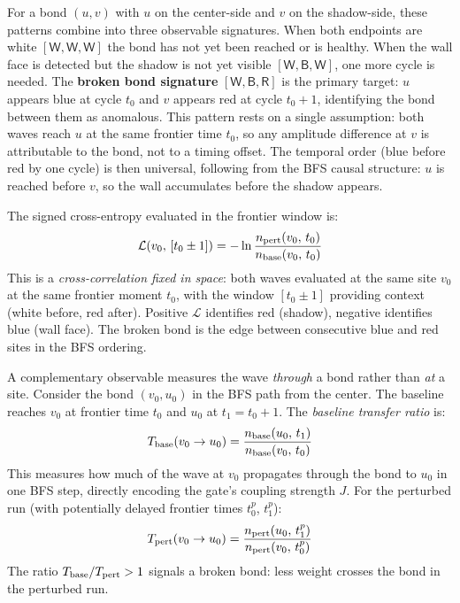 \documentclass[11pt]{article}
\begin{document}
For a bond $(u, v)$ with $u$ on the center-side and $v$ on the shadow-side,
these patterns combine into three observable signatures. When both endpoints
are white $[\mathsf{W,W,W}]$ the bond has not yet been reached or is healthy.
When the wall face is detected but the shadow is not yet visible $[\mathsf{W,B,W}]$,
one more cycle is needed. The \textbf{broken bond signature} $[\mathsf{W,B,R}]$
is the primary target: $u$ appears blue at cycle $t_0$ and $v$ appears red at
cycle $t_0+1$, identifying the bond between them as anomalous.
This pattern rests on a single assumption: both waves reach $u$ at the same
frontier time $t_0$, so any amplitude difference at $v$ is attributable to the
bond, not to a timing offset. The temporal order (blue before red by one cycle)
is then universal, following from the BFS causal structure: $u$ is reached
before $v$, so the wall accumulates before the shadow appears.

The signed cross-entropy evaluated in the frontier window is:
\begin{equation}
    \mathcal{L}(v_0,\, [t_0 \pm 1]) = -\ln \frac{n_{\rm pert}(v_0,\, t_0)}
                                                  {n_{\rm base}(v_0,\, t_0)}
\end{equation}
This is a \emph{cross-correlation fixed in space}: both waves evaluated at the same
site $v_0$ at the same frontier moment $t_0$, with the window $[t_0 \pm 1]$
providing context (white before, red after).
Positive $\mathcal{L}$ identifies red (shadow), negative identifies blue (wall face).
The broken bond is the edge between consecutive blue and red sites in the BFS ordering.

A complementary observable measures the wave \emph{through} a bond rather than \emph{at} a site.
Consider the bond $(v_0, u_0)$ in the BFS path from the center.
The baseline reaches $v_0$ at frontier time $t_0$ and $u_0$ at $t_1 = t_0 + 1$.
The \emph{baseline transfer ratio} is:
\begin{equation}
    T_{\rm base}(v_0 \to u_0) = \frac{n_{\rm base}(u_0,\, t_1)}{n_{\rm base}(v_0,\, t_0)}
\end{equation}
This measures how much of the wave at $v_0$ propagates through the bond to $u_0$ in one BFS step,
directly encoding the gate's coupling strength $J$.
For the perturbed run (with potentially delayed frontier times $t_0^p$, $t_1^p$):
\begin{equation}
    T_{\rm pert}(v_0 \to u_0) = \frac{n_{\rm pert}(u_0,\, t_1^p)}{n_{\rm pert}(v_0,\, t_0^p)}
\end{equation}
The ratio $T_{\rm base} / T_{\rm pert} > 1$ signals a broken bond: less weight
crosses the bond in the perturbed run.
\end{document}
